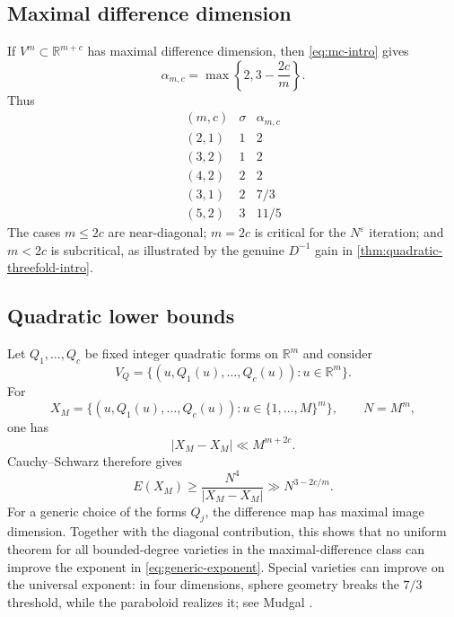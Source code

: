 \documentclass[11pt]{amsart}
\numberwithin{equation}{section}
\theoremstyle{definition}
\theoremstyle{remark}
\newcommand{\R}{\mathbb R}
\newcommand{\eps}{\varepsilon}
\newcommand{\1}{\mathbf 1}
\newcommand{\card}[1]{\lvert #1\rvert}
\begin{document}
\subsection{Maximal difference dimension}
If $V^m\subset\R^{m+c}$ has maximal difference dimension, then \eqref{eq:mc-intro} gives
\begin{equation}\label{eq:generic-exponent}
 \alpha_{m,c}=\max\left\{2,3-\frac{2c}{m}\right\}.
\end{equation}
Thus
\[
 \begin{array}{c|c|c}
 (m,c)&\sigma&\alpha_{m,c}\\ \hline
 (2,1)&1&2\\
 (3,2)&1&2\\
 (4,2)&2&2\\
 (3,1)&2&7/3\\
 (5,2)&3&11/5
 \end{array}
\]
The cases $m\leq2c$ are near-diagonal; $m=2c$ is critical for the $N^\eps$ iteration; and $m<2c$ is subcritical, as illustrated by the genuine $D^{-1}$ gain in \cref{thm:quadratic-threefold-intro}.

\subsection{Quadratic lower bounds}
Let $Q_1,\dots,Q_c$ be fixed integer quadratic forms on $\R^m$ and consider
\[
 V_Q=\{(u,Q_1(u),\dots,Q_c(u)):u\in\R^m\}.
\]
For
\[
 X_M=\{(u,Q_1(u),\dots,Q_c(u)):u\in\{1,\dots,M\}^m\},
 \qquad N=M^m,
\]
one has
\[
 \card{X_M-X_M}\ll M^{m+2c}.
\]
Cauchy--Schwarz therefore gives
\begin{equation}\label{eq:quadratic-lower}
 E(X_M)\geq\frac{N^4}{\card{X_M-X_M}}
 \gg N^{3-2c/m}.
\end{equation}
For a generic choice of the forms $Q_j$, the difference map has maximal image dimension.  Together with the diagonal contribution, this shows that no uniform theorem for all bounded-degree varieties in the maximal-difference class can improve the exponent in \eqref{eq:generic-exponent}.  Special varieties can improve on the universal exponent: in four dimensions, sphere geometry breaks the $7/3$ threshold, while the paraboloid realizes it; see Mudgal \cite{Mudgal}.
\end{document}

